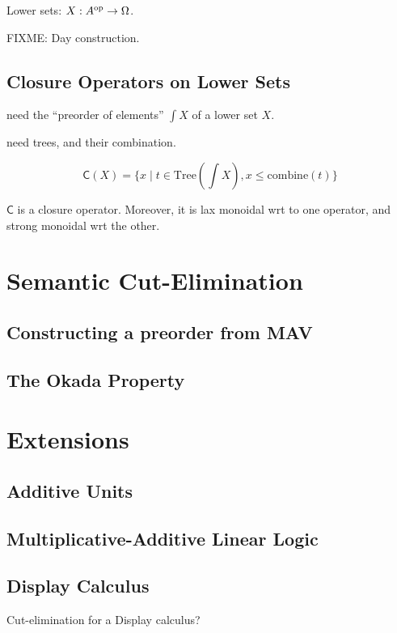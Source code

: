 \documentclass[twoside,11pt]{entics}
\begin{document}
Lower sets: $X : A^{\mathrm{op}} \to \Omega$.

\begin{proposition}
  FIXME: Day construction.
\end{proposition}

\subsection{Closure Operators on Lower Sets}

need the ``preorder of elements'' $\int X$ of a lower set $X$.

need trees, and their combination.


\begin{displaymath}
  \mathsf{C}(X) = \{ x \mid t \in \mathrm{Tree}(\int X), x \leq \mathrm{combine}(t) \}
\end{displaymath}

\begin{theorem}
  $\mathsf{C}$ is a closure operator. Moreover, it is lax monoidal wrt
  to one operator, and strong monoidal wrt the other.
\end{theorem}

\section{Semantic Cut-Elimination}

\subsection{Constructing a preorder from MAV}

\subsection{The Okada Property}

\section{Extensions}
\label{sec:extensions}

\subsection{Additive Units}

\subsection{Multiplicative-Additive Linear Logic}

\subsection{Display Calculus}

Cut-elimination for a Display calculus?



\end{document}

